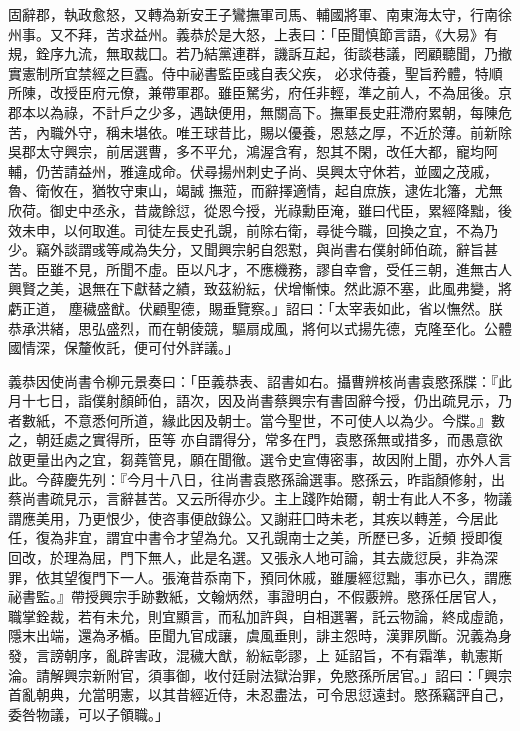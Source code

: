 \begin{pinyinscope}
 固辭郡，執政愈怒，又轉為新安王子鸞撫軍司馬、輔國將軍、南東海太守，行南徐州事。又不拜，苦求益州。義恭於是大怒，上表曰：「臣聞慎節言語，《大易》有規，銓序九流，無取裁囗。若乃結黨連群，譏訴互起，街談巷議，罔顧聽聞，乃撤實憲制所宜禁經之巨蠹。侍中祕書監臣彧自表父疾，
 必求侍養，聖旨矜體，特順所陳，改授臣府元僚，兼帶軍郡。雖臣駑劣，府任非輕，準之前人，不為屈後。京郡本以為祿，不計戶之少多，遇缺便用，無關高下。撫軍長史莊滯府累朝，每陳危苦，內職外守，稱未堪依。唯王球昔比，賜以優養，恩慈之厚，不近於薄。前新除吳郡太守興宗，前居選曹，多不平允，鴻渥含宥，恕其不閑，改任大都，寵均阿輔，仍苦請益州，雅違成命。伏尋揚州刺史子尚、吳興太守休若，並國之茂戚，魯、衛攸在，猶牧守東山，竭誠
 撫蒞，而辭擇適情，起自庶族，逮佐北籓，尤無欣荷。御史中丞永，昔歲餘愆，從恩今授，光祿勳臣淹，雖曰代臣，累經降黜，後效未申，以何取進。司徒左長史孔覬，前除右衛，尋徙今職，回換之宜，不為乃少。竊外談謂彧等咸為失分，又聞興宗躬自怨懟，與尚書右僕射師伯疏，辭旨甚苦。臣雖不見，所聞不虛。臣以凡才，不應機務，謬自幸會，受任三朝，進無古人興賢之美，退無在下獻替之績，致茲紛紜，伏增慚悚。然此源不塞，此風弗變，將虧正道，
 塵穢盛猷。伏顧聖德，賜垂覽察。」詔曰：「太宰表如此，省以憮然。朕恭承洪緒，思弘盛烈，而在朝倰競，驅扇成風，將何以式揚先德，克隆至化。公體國情深，保釐攸託，便可付外詳議。」



 義恭因使尚書令柳元景奏曰：「臣義恭表、詔書如右。攝曹辨核尚書袁愍孫牒：『此月十七日，詣僕射顏師伯，語次，因及尚書蔡興宗有書固辭今授，仍出疏見示，乃者數紙，不意悉何所道，緣此因及朝士。當今聖世，不可使人以為少。今牒。』數之，朝廷處之實得所，臣等
 亦自謂得分，常多在門，袁愍孫無或措多，而愚意欲啟更量出內之宜，芻蕘管見，願在聞徹。選令史宣傳密事，故因附上聞，亦外人言此。今薛慶先列：『今月十八日，往尚書袁愍孫論選事。愍孫云，昨詣顏修射，出蔡尚書疏見示，言辭甚苦。又云所得亦少。主上踐阼始爾，朝士有此人不多，物議謂應美用，乃更恨少，使咨事便啟錄公。又謝莊囗時未老，其疾以轉差，今居此任，復為非宜，謂宜中書令才望為允。又孔覬南士之美，所歷已多，近頻
 授即復回改，於理為屈，門下無人，此是名選。又張永人地可論，其去歲愆戾，非為深罪，依其望復門下一人。張淹昔忝南下，預同休戚，雖屢經愆黜，事亦已久，謂應祕書監。』帶授興宗手跡數紙，文翰炳然，事證明白，不假覈辨。愍孫任居官人，職掌銓裁，若有未允，則宜顯言，而私加許與，自相選署，託云物論，終成虛詭，隱末出端，還為矛楯。臣聞九官成讓，虞風垂則，誹主怨時，漢罪夙斷。況義為身發，言謗朝序，亂辟害政，混穢大猷，紛紜彰謬，上
 延詔旨，不有霜準，軌憲斯淪。請解興宗新附官，須事御，收付廷尉法獄治罪，免愍孫所居官。」詔曰：「興宗首亂朝典，允當明憲，以其昔經近侍，未忍盡法，可令思愆遠封。愍孫竊評自己，委咎物議，可以子領職。」




\end{pinyinscope}
